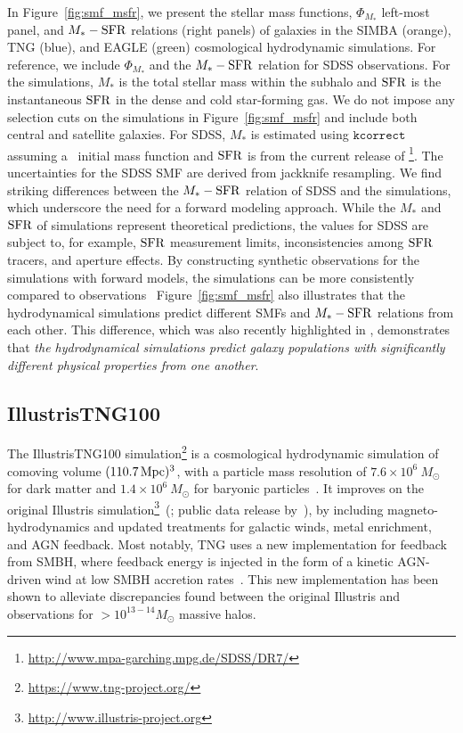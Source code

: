 In Figure~\ref{fig:smf_msfr}, we present the stellar mass functions,
$\Phi_{M_*}$ left-most panel, and $M_*-{\rm SFR}$ relations (right panels) of
galaxies in the  SIMBA (orange), TNG (blue), and EAGLE (green) cosmological
hydrodynamic simulations.  For reference, we include $\Phi_{M_*}$ and the 
$M_*-{\rm SFR}$ relation for SDSS observations. For the simulations, $M_*$ is the
total stellar mass within the subhalo and ${\rm SFR}$ is the instantaneous ${\rm SFR}$ in the
dense and cold star-forming gas. 
We do not impose any selection cuts on the simulations in
Figure~\ref{fig:smf_msfr} and include both central and satellite galaxies. 
For SDSS, $M_*$ is estimated using $\mathtt{kcorrect}$~\citep{blanton2007a} 
assuming a~\cite{chabrier2003} initial mass function and ${\rm SFR}$ is from the
current release of \cite{brinchmann2004}\footnote{\url{http://www.mpa-garching.mpg.de/SDSS/DR7/}}.
The uncertainties for the SDSS SMF are derived from jackknife resampling.
We find striking differences between the $M_*-{\rm SFR}$ relation of SDSS and
the simulations, which underscore the need for a forward modeling approach.
While the $M_*$ and ${\rm SFR}$ of simulations represent theoretical
predictions, the values for SDSS are subject to, for example, ${\rm SFR}$
measurement limits, inconsistencies among ${\rm SFR}$ tracers, and aperture
effects.
By constructing synthetic observations for the simulations with forward
models, the simulations can be more consistently compared to
observations~\citep[see \eg][Starkenburg et al. in prep.]{dickey2020}
Figure~\ref{fig:smf_msfr} also illustrates that the hydrodynamical simulations
predict different SMFs and $M_*-{\rm SFR}$ relations from each other.
This difference, which was also recently highlighted in \cite{hahn2019c},
demonstrates that \emph{the hydrodynamical simulations predict galaxy
populations with significantly different physical properties from one
another}.

\subsection{IllustrisTNG100} \label{sec:tng}
The IllustrisTNG100 simulation\footnote{\url{https://www.tng-project.org/}}
is a cosmological hydrodynamic simulation of comoving volume 
$(110.7\,{\rm Mpc})^3$, with a particle mass resolution of $7.6 \times 10^{6}\ M_\odot$ for dark matter and $1.4 \times 10^{6}\ M_\odot$ for baryonic particles~\citep{nelson2018, pillepich2018, springel2018}. It improves on
the original Illustris simulation\footnote{\url{http://www.illustris-project.org}}~(\citealt{vogelsberger2014, genel2014};
public data release by~\citealt{nelson2015}), by including
magneto-hydrodynamics and updated treatments for galactic winds, metal
enrichment, and AGN feedback. Most notably, TNG uses a new implementation for
feedback from SMBH, where feedback energy is injected in the form of a kinetic
AGN-driven wind at low SMBH accretion rates~\citep{weinberger2018}. This new
implementation has been shown to alleviate discrepancies found between the
original Illustris and observations for $> 10^{13-14} M_\odot$ massive halos. 


